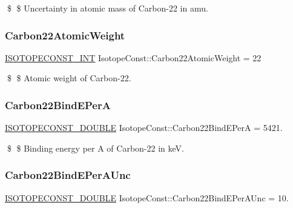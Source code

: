 \$ \$ Uncertainty in atomic mass of Carbon-\/22 in amu. \mbox{\label{group___isotope_const-_carbon-_c22_ga7fcd52c2908550b86ce482e72c0b2306}} 
\subsubsection{\texorpdfstring{Carbon22\+Atomic\+Weight}{Carbon22AtomicWeight}}
{\footnotesize\ttfamily \mbox{\hyperlink{group___isotope_const-_macros_ga5f18360b3e99483a35c32d789e62621c}{I\+S\+O\+T\+O\+P\+E\+C\+O\+N\+S\+T\+\_\+\+I\+NT}} Isotope\+Const\+::\+Carbon22\+Atomic\+Weight = 22}

\$ \$ Atomic weight of Carbon-\/22. \mbox{\label{group___isotope_const-_carbon-_c22_ga1be4b594fc74e4cba18e33b9814d295a}} 
\subsubsection{\texorpdfstring{Carbon22\+Bind\+E\+PerA}{Carbon22BindEPerA}}
{\footnotesize\ttfamily \mbox{\hyperlink{group___isotope_const-_macros_ga8f45a7272ce02c0b4c65c44636ed719a}{I\+S\+O\+T\+O\+P\+E\+C\+O\+N\+S\+T\+\_\+\+D\+O\+U\+B\+LE}} Isotope\+Const\+::\+Carbon22\+Bind\+E\+PerA = 5421.}

\$ \$ Binding energy per A of Carbon-\/22 in keV. \mbox{\label{group___isotope_const-_carbon-_c22_gaca4e529a77354ee1dd2cfc8e577bfb29}} 
\subsubsection{\texorpdfstring{Carbon22\+Bind\+E\+Per\+A\+Unc}{Carbon22BindEPerAUnc}}
{\footnotesize\ttfamily \mbox{\hyperlink{group___isotope_const-_macros_ga8f45a7272ce02c0b4c65c44636ed719a}{I\+S\+O\+T\+O\+P\+E\+C\+O\+N\+S\+T\+\_\+\+D\+O\+U\+B\+LE}} Isotope\+Const\+::\+Carbon22\+Bind\+E\+Per\+A\+Unc = 10.}


